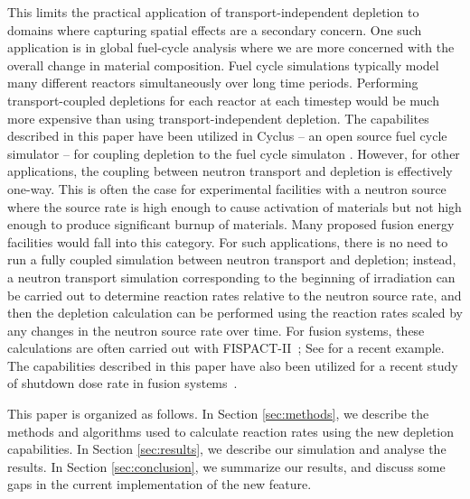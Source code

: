     This limits the practical application of transport-independent depletion to
    domains where capturing spatial effects are a secondary concern. One
    such application is in global fuel-cycle analysis where we are more
    concerned with the overall change in material composition. Fuel cycle
    simulations typically model many different reactors simultaneously over
    long time periods. Performing transport-coupled depletions for each reactor
    at each timestep would be much more expensive than using
    transport-independent depletion. The capabilites described in this paper
    have been utilized in Cyclus \citep{huff_fundamental_2016} -- an open source
    fuel cycle simulator -- for coupling depletion to the fuel cycle
    simulaton \citep{bachmann_os_2024}. However, for other applications, the
    coupling between neutron transport and depletion is effectively one-way.
    This is often the case for experimental facilities with a neutron source
    where the source rate is high enough to cause activation of materials but
    not high enough to produce significant burnup of materials. Many proposed fusion
    energy facilities would fall into this category.  For such applications, there is
    no need to run a fully coupled simulation between neutron transport and
    depletion; instead, a neutron transport simulation corresponding to the
    beginning of irradiation can be carried out to determine reaction rates
    relative to the neutron source rate, and then the depletion calculation can
    be performed using the reaction rates scaled by any changes in the neutron
    source rate over time. For fusion systems, these calculations are often
    carried out with FISPACT-II~\citep{sublet2017nds}; See \citet{eade2020nf}
    for a recent example. The capabilities described in this paper have also
    been utilized for a recent study of shutdown dose rate in fusion
    systems~\citep{peterson2024nf}.

    This paper is organized as follows. In Section \ref{sec:methods}, we describe
    the methods and algorithms used to calculate reaction rates using the new
    depletion capabilities. In Section \ref{sec:results}, we describe our
    simulation and analyse the results. In Section \ref{sec:conclusion}, we
    summarize our results, and discuss some gaps in the current implementation
    of the new feature.


